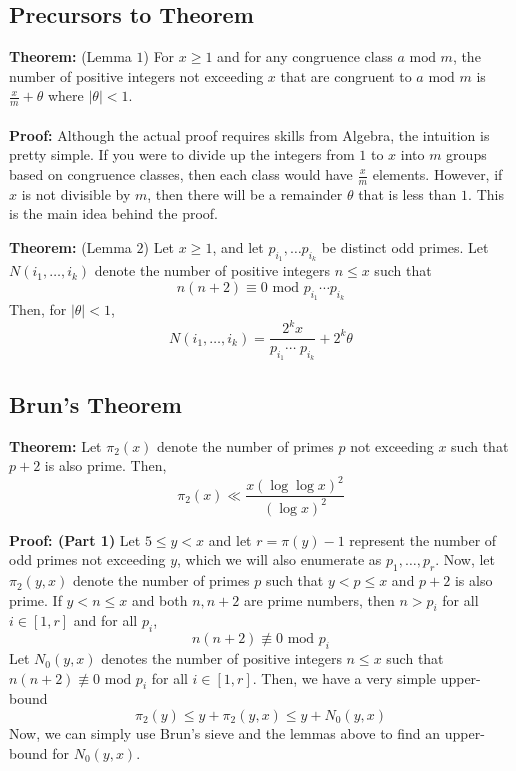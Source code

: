 \documentclass[8pt]{extarticle}
\begin{document}
\subsection{Precursors to Theorem}
\begin{boxedsection}
    \textbf{Theorem:} (Lemma $1$) For $x \geq 1$ and for any congruence class $a \text{ mod } m$, the number of positive integers not exceeding $x$ that are congruent to $a \text{ mod } m$ is $\frac{x}{m} + \theta$ where $|\theta| < 1$. \\
    \\
    \textbf{Proof:} Although the actual proof requires skills from Algebra, the intuition is pretty simple. If you were to divide up the integers from $1$ to $x$ into $m$ groups based on congruence classes, then each class would have $\frac{x}{m}$ elements. However, if $x$ is not divisible by $m$, then there will be a remainder $\theta$ that is less than $1$. This is the main idea behind the proof.
\end{boxedsection}
\begin{boxedsection}
    \textbf{Theorem:} (Lemma $2$) Let $x \geq 1$, and let $p_{i_1}, \dots p_{i_k}$ be distinct odd primes. Let $N(i_1, \dots, i_k)$ denote the number of positive integers $n \leq x$ such that
    $$
    n(n+2) \equiv 0 \text{ mod } p_{i_1} \cdots p_{i_k}
    $$
    Then, for $|\theta| < 1$,
    $$
    N(i_1, \dots, i_k) = \frac{2^k x}{p_{i_1} \cdots \;p_{i_k}} + 2^k\theta
    $$
\end{boxedsection}
\subsection{Brun's Theorem}
\begin{boxedsection}
    \textbf{Theorem:} Let $\pi_2(x)$ denote the number of primes $p$ not exceeding $x$ such that $p+2$ is also prime. Then,
    $$
    \pi_2(x) \ll \frac{x (\log \log x)^2}{(\log x)^2}
    $$
\end{boxedsection}
\begin{boxedsection}
    \textbf{Proof: (Part 1)} Let $5 \leq y < x$ and let $r = \pi(y) - 1$ represent the number of odd primes not exceeding $y$, which we will also enumerate as $p_1, \dots, p_r$. Now, let $\pi_2(y,x)$ denote the 
    number of primes $p$ such that $y < p \leq x$ and $p+2$ is also prime. If $y < n \leq x$ and both $n, n+2$ are prime numbers, then $n > p_i$ for all $i \in [1,r]$ and for all $p_i$,
    $$
    n(n+2) \nequiv 0 \text{ mod } p_i
    $$
    Let $N_0(y,x)$ denotes the number of positive integers $n \leq x$ such that $n(n+2) \nequiv 0 \text{ mod } p_i$ for all $i \in [1,r]$. Then, we have a very simple upper-bound
    $$
    \pi_2(y) \leq y + \pi_2(y,x) \leq y + N_0(y,x)
    $$
    Now, we can simply use Brun's sieve and the lemmas above to find an upper-bound for $N_0(y,x)$.
\end{boxedsection}
\end{document}

